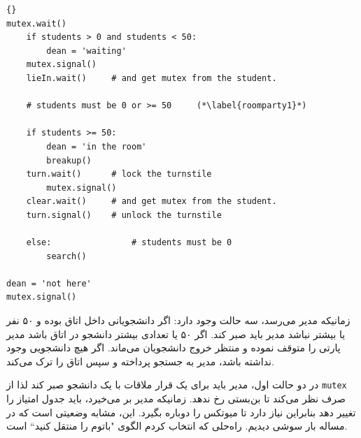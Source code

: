 \documentclass{book}
\begin{document}
\begin{latin}
\begin{lstlisting}[title=\rl{راه‌حل اتاق پارتی (مدیر)}]{}
mutex.wait()
    if students > 0 and students < 50:
        dean = 'waiting'
	mutex.signal()
	lieIn.wait()     # and get mutex from the student.

    # students must be 0 or >= 50     (*\label{roomparty1}*)

    if students >= 50:
        dean = 'in the room'
        breakup()
	turn.wait()      # lock the turnstile
        mutex.signal()
	clear.wait()     # and get mutex from the student.
	turn.signal()    # unlock the turnstile

    else:                # students must be 0
        search()

dean = 'not here'
mutex.signal() 
\end{lstlisting}
\end{latin}

    زمانیکه مدیر می‌رسد، سه حالت وجود دارد: 
    اگر دانشجویانی داخل اتاق بوده و ۵۰ نفر یا بیشتر  نباشد مدیر باید صبر کند. اگر ۵۰ یا تعدادی بیشتر دانشجو در اتاق باشد مدیر پارتی را متوقف نموده و 
    منتظر خروج دانشجویان می‌ماند. اگر هیچ دانشجویی وجود نداشته باشد، مدیر به جستجو پرداخته و سپس اتاق را ترک می‌کند. 
    

    در دو حالت اول، مدیر باید برای یک قرار ملاقات با یک دانشجو صبر کند لذا از {\tt mutex} صرف نظر می‌‌کند تا بن‌بستی رخ ندهد. 
    زمانیکه مدیر بر می‌خیرد، باید جدول امتیاز را تغییر دهد بنابراین نیاز دارد تا میوتکس را دوباره بگیرد. 
    این، مشابه وضعیتی است که در مساله بار سوشی دیدیم. راه‌حلی که انتخاب کردم الگوی "باتوم را منتقل کنید`` است. 
\end{document}
